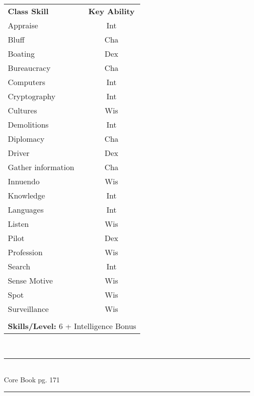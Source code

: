\begin{table}[htb]
\raggedright
\begin{tabular}{l c}
\textbf{Class Skill} & \textbf{Key Ability}\\

Appraise & Int\\
Bluff & Cha\\
Boating & Dex\\
Bureaucracy & Cha\\
Computers & Int\\
Cryptography & Int\\
Cultures & Wis\\
Demolitions & Int\\
Diplomacy & Cha\\
Driver & Dex\\
Gather information & Cha\\
Innuendo & Wis\\
Knowledge & Int\\
Languages & Int\\
Listen & Wis\\
Pilot & Dex\\
Profession & Wis\\
Search & Int\\
Sense Motive & Wis\\
Spot & Wis\\
Surveillance & Wis\\


\multicolumn{2}{l}{\cellcolor{white}}\\
\multicolumn{2}{l}{\cellcolor{white}\textbf{Skills/Level:} 6 + Intelligence Bonus}\\
\end{tabular}
\end{table}

\setlength{\intextsep}{14.0pt plus 4.0pt minus 4.0pt}

\vspace*{3cm}

\vspace*{\fill}

\begin{center}
\textsc{\Large}\\[0.25cm]
\rule{\linewidth}{0.5mm}\\[0.6cm]
\fontsize{30}{30} \selectfont Core Book pg. 171\\
\rule{\linewidth}{0.5mm}\\[0.6cm]
\vfill
\end{center}

\pagebreak



